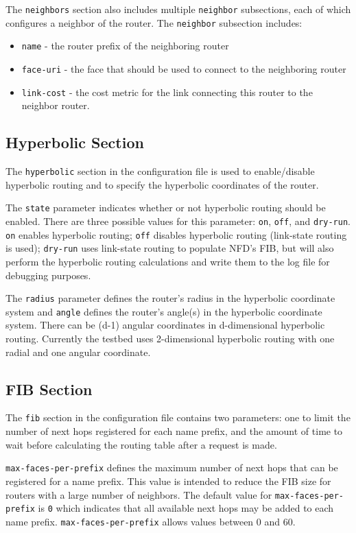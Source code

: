 The \texttt{neighbors} section also includes multiple \texttt{neighbor} subsections, each of which configures a neighbor of the router.
The \texttt{neighbor} subsection includes:
\begin{itemize}
\item \texttt{name} - the router prefix of the neighboring router
\item \texttt{face-uri} - the face that should be used to connect to the neighboring router
\item \texttt{link-cost} - the cost metric for the link connecting this router to the neighbor router.
\end{itemize}

\subsection{Hyperbolic Section}

The \texttt{hyperbolic} section in the configuration file is used to enable/disable hyperbolic routing and to specify the hyperbolic coordinates of the router.

The \texttt{state} parameter indicates whether or not hyperbolic routing should be enabled. There are three possible values for this parameter: \texttt{on}, \texttt{off}, and \texttt{dry-run}. \texttt{on} enables hyperbolic routing; \texttt{off} disables hyperbolic routing (link-state routing is used); \texttt{dry-run} uses link-state routing to populate NFD's FIB, but will also perform the hyperbolic routing calculations and write them to the log file for debugging purposes.

The \texttt{radius} parameter defines the router's radius in the hyperbolic coordinate system and \texttt{angle} defines the router's angle(s) in the hyperbolic coordinate system. There can be (d-1) angular coordinates in d-dimensional hyperbolic routing. Currently the testbed uses 2-dimensional hyperbolic routing with one radial and one angular coordinate.

\subsection{FIB Section}

The \texttt{fib} section in the configuration file contains two parameters: one to limit the number of next hops registered for each name prefix, and the amount of time to wait before calculating the routing table after a request is made.

\texttt{max-faces-per-prefix} defines the maximum number of next hops that can be registered for a name prefix.
This value is intended to reduce the FIB size for routers with a large number of neighbors.
The default value for \texttt{max-faces-per-prefix} is \texttt{0} which indicates that all available next hops may be added to each name prefix. \texttt{max-faces-per-prefix} allows values between 0 and 60.

